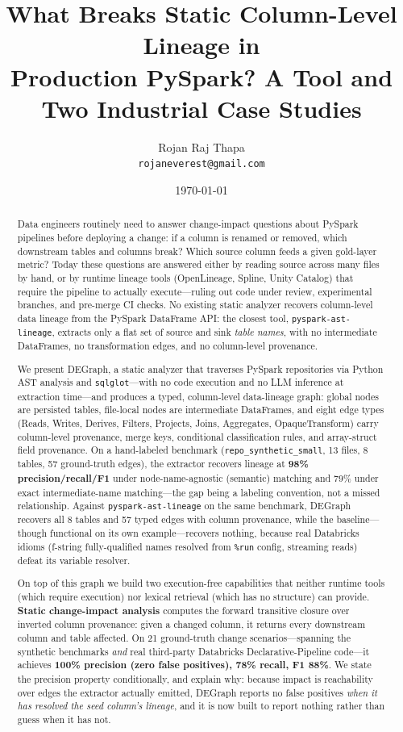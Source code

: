 \documentclass[11pt]{article}
\title{\textbf{What Breaks Static Column-Level Lineage in\\
Production PySpark? A Tool and Two Industrial Case Studies}}
\author{Rojan Raj Thapa\\ \texttt{rojaneverest@gmail.com}}
\date{\today}
\newcommand{\code}[1]{\texttt{#1}}
\begin{document}
\maketitle

\begin{abstract}
Data engineers routinely need to answer change-impact questions about PySpark
pipelines before deploying a change: if a column is renamed or removed, which
downstream tables and columns break? Which source column feeds a given gold-layer
metric? Today these questions are answered either by reading source across many
files by hand, or by runtime lineage tools (OpenLineage, Spline, Unity Catalog)
that require the pipeline to actually execute---ruling out code under review,
experimental branches, and pre-merge CI checks. No existing static analyzer
recovers column-level data lineage from the PySpark DataFrame API: the closest
tool, \code{pyspark-ast-lineage}, extracts only a flat set of source and sink
\emph{table names}, with no intermediate DataFrames, no transformation edges, and
no column-level provenance.

We present DEGraph, a static analyzer that traverses PySpark repositories via
Python AST analysis and \code{sqlglot}---with no code execution and no LLM
inference at extraction time---and produces a typed, column-level data-lineage
graph: global nodes are persisted tables, file-local nodes are intermediate
DataFrames, and eight edge types (Reads, Writes, Derives, Filters, Projects,
Joins, Aggregates, OpaqueTransform) carry column-level provenance, merge keys,
conditional classification rules, and array-struct field provenance. On a
hand-labeled benchmark (\code{repo_synthetic_small}, 13 files, 8 tables, 57
ground-truth edges), the extractor recovers lineage at \textbf{98\%
precision/recall/F1} under node-name-agnostic (semantic) matching and 79\% under
exact intermediate-name matching---the gap being a labeling convention, not a
missed relationship. Against \code{pyspark-ast-lineage} on the same benchmark,
DEGraph recovers all 8 tables and 57 typed edges with column provenance, while the
baseline---though functional on its own example---recovers nothing, because real
Databricks idioms (f-string fully-qualified names resolved from \code{\%run}
config, streaming reads) defeat its variable resolver.

On top of this graph we build two execution-free capabilities that neither runtime
tools (which require execution) nor lexical retrieval (which has no structure) can
provide. \textbf{Static change-impact analysis} computes the forward transitive
closure over inverted column provenance: given a changed column, it returns every
downstream column and table affected. On 21 ground-truth change scenarios---spanning
the synthetic benchmarks \emph{and} real third-party Databricks Declarative-Pipeline
code---it achieves \textbf{100\% precision (zero false positives), 78\% recall, F1
88\%}. We state the precision property conditionally, and explain why: because impact
is reachability over edges the extractor actually emitted, DEGraph reports no false
positives \emph{when it has resolved the seed column's lineage}, and it is now built
to report nothing rather than guess when it has not.


\end{abstract}
\end{document}
